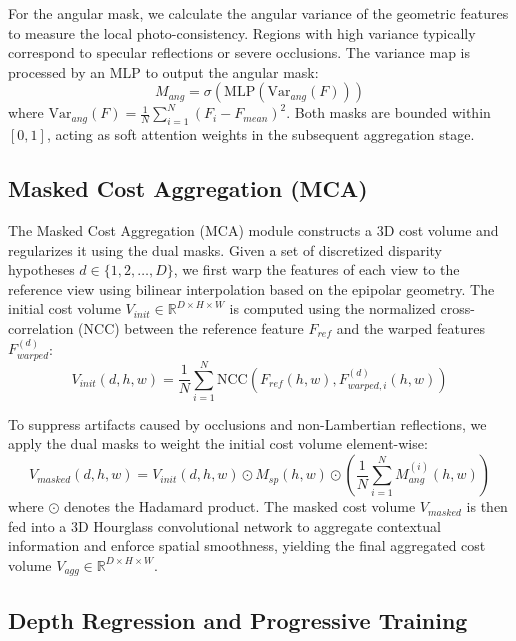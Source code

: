 For the angular mask, we calculate the angular variance of the geometric features to measure the local photo-consistency. Regions with high variance typically correspond to specular reflections or severe occlusions. The variance map is processed by an MLP to output the angular mask:
\begin{equation}
\label{eq:eq29}
M_{ang} = \sigma\left(\text{MLP}\left(\text{Var}_{ang}(F)\right)\right)
\end{equation}
where $\text{Var}_{ang}(F) = \frac{1}{N}\sum_{i=1}^N (F_i - F_{mean})^2$. Both masks are bounded within $[0, 1]$, acting as soft attention weights in the subsequent aggregation stage.

\subsection{Masked Cost Aggregation (MCA)}

The Masked Cost Aggregation (MCA) module constructs a 3D cost volume and regularizes it using the dual masks. Given a set of discretized disparity hypotheses $d \in \{1, 2, \dots, D\}$, we first warp the features of each view to the reference view using bilinear interpolation based on the epipolar geometry. The initial cost volume $V_{init} \in \mathbb{R}^{D \times H \times W}$ is computed using the normalized cross-correlation (NCC) between the reference feature $F_{ref}$ and the warped features $F_{warped}^{(d)}$:
\begin{equation}
\label{eq:eq30}
V_{init}(d, h, w) = \frac{1}{N} \sum_{i=1}^{N} \text{NCC}\left(F_{ref}(h,w), F_{warped, i}^{(d)}(h,w)\right)
\end{equation}

To suppress artifacts caused by occlusions and non-Lambertian reflections, we apply the dual masks to weight the initial cost volume element-wise:
\begin{equation}
\label{eq:eq31}
V_{masked}(d, h, w) = V_{init}(d, h, w) \odot M_{sp}(h,w) \odot \left( \frac{1}{N} \sum_{i=1}^{N} M_{ang}^{(i)}(h,w) \right)
\end{equation}
where $\odot$ denotes the Hadamard product. The masked cost volume $V_{masked}$ is then fed into a 3D Hourglass convolutional network to aggregate contextual information and enforce spatial smoothness, yielding the final aggregated cost volume $V_{agg} \in \mathbb{R}^{D \times H \times W}$.

\subsection{Depth Regression and Progressive Training}

